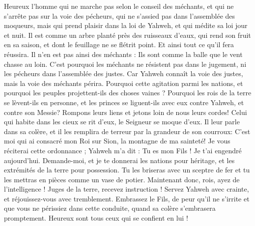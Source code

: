 \begin{multicols}{2}
\VerseOne{}Heureux l'homme qui ne marche pas selon le conseil des méchants, et qui ne s'arrête pas sur la voie des pécheurs, qui ne s'assied pas dans l'assemblée des moqueurs,
mais qui prend plaisir dans la loi de Yahweh, et qui médite sa loi jour et nuit.
Il est comme un arbre planté près des ruisseaux d'eaux, qui rend son fruit en sa saison, et dont le feuillage ne se flétrit point. Et ainsi tout ce qu'il fera réussira.
Il n'en est pas ainsi des méchants : Ils sont comme la balle que le vent chasse au loin.
C'est pourquoi les méchants ne résistent pas dans le jugement, ni les pécheurs dans l'assemblée des justes.
Car Yahweh connaît la voie des justes, mais la voie des méchants périra.
\VerseOne{}Pourquoi cette agitation parmi les nations, et pourquoi les peuples projettent-ils des choses vaines ?
Pourquoi les rois de la terre se lèvent-ils en personne, et les princes se liguent-ils avec eux contre Yahweh, et contre son Messie?
Rompons leurs liens et jetons loin de nous leurs cordes!
Celui qui habite dans les cieux se rit d'eux, le Seigneur se moque d'eux.
Il leur parle dans sa colère, et il les remplira de terreur par la grandeur de son courroux:
C'est moi qui ai consacré mon Roi sur Sion, la montagne de ma sainteté!
Je vous réciterai cette ordonnance ; Yahweh m'a dit : Tu es mon Fils ! Je t'ai engendré aujourd'hui.
Demande-moi, et je te donnerai les nations pour héritage, et les extrémités de la terre pour possession.
Tu les briseras avec un sceptre de fer et tu les mettras en pièces comme un vase de potier.
Maintenant donc, rois, ayez de l'intelligence ! Juges de la terre, recevez instruction !
Servez Yahweh avec crainte, et réjouissez-vous avec tremblement.
Embrassez le Fils, de peur qu'il ne s'irrite et que vous ne périssiez dans cette conduite, quand sa colère s'embrasera promptement. Heureux sont tous ceux qui se confient en lui !

\end{multicols}
